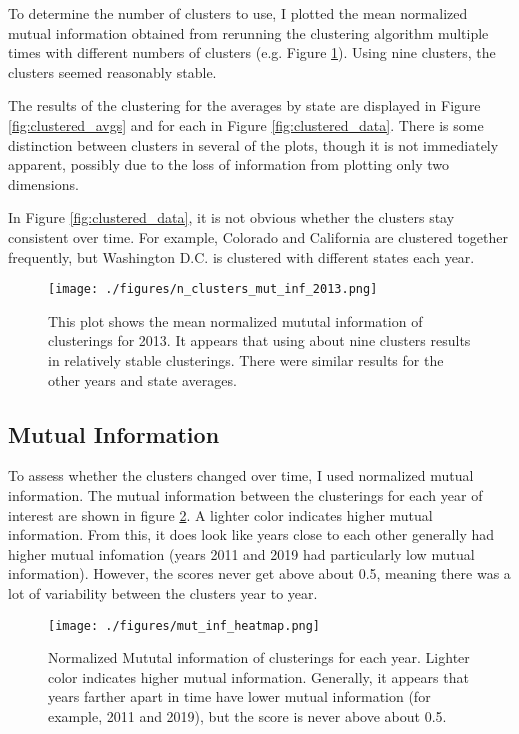 \documentclass[11pt]{article}
\begin{document}
To determine the number of clusters to use, I plotted the mean normalized mutual information obtained from rerunning the clustering algorithm multiple times with different numbers of clusters (e.g. Figure \ref{fig:n_clusters}). Using nine clusters, the clusters seemed reasonably stable. 

The results of the clustering for the averages by state are displayed in Figure \ref{fig:clustered_avgs} and for each in Figure \ref{fig:clustered_data}. There is some distinction between clusters in several of the plots, though it is not immediately apparent, possibly due to the loss of information from plotting only two dimensions.

In Figure \ref{fig:clustered_data}, it is not obvious whether the clusters stay consistent over time. For example, Colorado and California are clustered together frequently, but Washington D.C. is clustered with different states each year. 

\begin{figure}[htbp]
\centering
\texttt{[image: ./figures/n\_clusters\_mut\_inf\_2013.png]}
\caption{\label{fig:n_clusters} This plot shows the mean normalized mututal information of clusterings for 2013. It appears that using about nine clusters results in relatively stable clusterings. There were similar results for the other years and state averages.}
\end{figure}

\subsection{Mutual Information}
To assess whether the clusters changed over time, I used normalized mutual information. The mutual information between the clusterings for each year of interest are shown in figure \ref{fig:mut_inf}. A lighter color indicates higher mutual information. From this, it does look like years close to each other generally had higher mutual infomation (years 2011 and 2019 had particularly low mutual information). However, the scores never get above about 0.5, meaning there was a lot of variability between the clusters year to year. 


\begin{figure}[htbp]
\centering
\texttt{[image: ./figures/mut\_inf\_heatmap.png]}
\caption{\label{fig:mut_inf} Normalized Mututal information of clusterings for each year. Lighter color indicates higher mutual information. Generally, it appears that years farther apart in time have lower mutual information (for example, 2011 and 2019), but the score is never above about 0.5.}
\end{figure}
\end{document}

